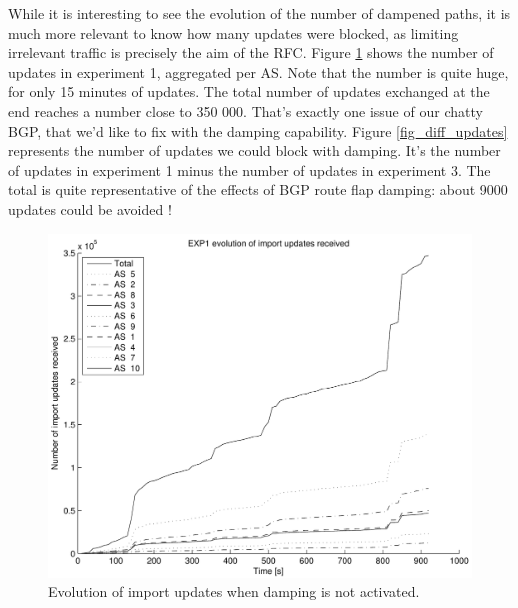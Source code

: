 \documentclass[a4paper,english]{IEEEtran}
\begin{document}
While it is interesting to see the evolution of the number of dampened paths, it is much more relevant to know
how many updates were blocked, as limiting irrelevant traffic is precisely the aim of the RFC.
Figure \ref{fig_exp1_updates} shows the number of updates in experiment 1, aggregated per AS. Note that the number is quite huge,
for only 15 minutes of updates. The total number of updates exchanged at the end reaches a number close to 350 000. 
That's exactly one issue of our chatty BGP, that we'd like to fix with the damping capability.
Figure \ref{fig_diff_updates} represents the number of updates we could block with damping. It's the number of updates
in experiment 1 minus the number of updates in experiment 3. The total is quite representative of the effects of BGP
route flap damping: about 9000 updates could be avoided !

\begin{figure}
\begin{center}
\includegraphics[scale=.5]{img/exp1_updates.pdf}
\end{center}
\caption{Evolution of import updates when damping is not activated.}
\label{fig_exp1_updates}
\end{figure}
\end{document}
